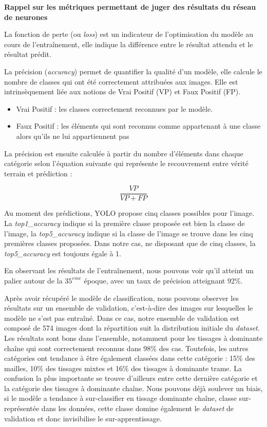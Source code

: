  \begin{minipage}{\dimexpr\textwidth-3cm}
	\textbf{Rappel sur les métriques permettant de juger des résultats du réseau de neurones}

	La fonction de perte (ou \textit{loss}) est un indicateur de l'optimisation du modèle au cours de l'entraînement, elle indique la différence entre le résultat attendu et le résultat prédit.
	
	La précision (\textit{accuracy}) permet de quantifier la qualité d'un modèle, elle calcule le nombre de classes qui ont été correctement attribuées aux images. Elle est intrinsèquement liée aux notions de Vrai Positif (VP) et Faux Positif (FP).
	\begin{itemize}
	    \item Vrai Positif : les classes correctement reconnues par le modèle. 
	    \item Faux Positif : les éléments qui sont reconnus comme appartenant à une classe alors qu'ils ne lui appartiennent pas 
	\end{itemize}

	La précision est ensuite calculée à partir du nombre d'éléments dans chaque catégorie selon l'équation suivante qui représente le recouvrement entre vérité terrain et prédiction : 

	\[ \frac{VP}{VP+FP} \] 
	
\noindent Au moment des prédictions, YOLO propose cinq classes possibles pour l'image. La \textit{top1\_accuracy} indique si la première classe proposée est bien la classe de l'image, la \textit{top5\_accuracy} indique si la classe de l'image se trouve dans les cinq premières classes proposées. Dans notre cas, ne disposant que de cinq classes, la \textit{top5\_accuracy} est toujours égale à 1.\\
 \end{minipage}

\noindent En observant les résultats de l'entraînement, nous pouvons voir qu'il atteint un palier autour de la $35^{eme}$ époque, avec un taux de précision atteignant 92\%.

Après avoir récupéré le modèle de classification, nous pouvons observer les résultats sur un ensemble de validation, c'est-à-dire des images sur lesquelles le modèle ne s'est pas entraîné. Dans ce cas, notre ensemble de validation est composé de 574 images dont la répartition suit la distribution initiale du \textit{dataset}. Les résultats sont bons dans l'ensemble, notamment pour les tissages à dominante chaîne qui sont correctement reconnus dans 98\% des cas. Toutefois, les autres catégories ont tendance à être également classées dans cette catégorie : 15\% des mailles, 10\% des tissages mixtes et 16\% des tissages à dominante trame. La confusion la plus importante se trouve d'ailleurs entre cette dernière catégorie et la catégorie des tissages à dominante chaîne. Nous pouvons déjà soulever un biais, si le modèle a tendance à sur-classifier en tissage dominante chaîne, classe sur-représentée dans les données, cette classe domine également le \textit{dataset} de validation et donc invisibilise le sur-apprentissage.

